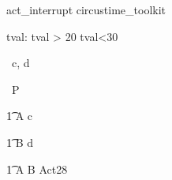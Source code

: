 \begin{zsection}
   \SECTION act\_interrupt \parents circustime\_toolkit
\end{zsection}


\begin{axdef}
   tval: \nat
\where
   tval > 20 \land tval<30
\end{axdef}


\begin{circus}
   \circchannel\ c, d \\
\end{circus}

\begin{circus}
    \circprocess\ P \circdef \circbegin \\
\end{circus}


\begin{circusaction}
    	\t1 A \circdef c \then \Skip \\
\end{circusaction}

\begin{circusaction}
        \t1 B \circdef d \then \Skip \\
\end{circusaction}




\begin{circusaction}        
        \t1 \circspot A \circseq B \extchoice Act28\\
\end{circusaction}

\begin{circus}    
\circend
\end{circus}
